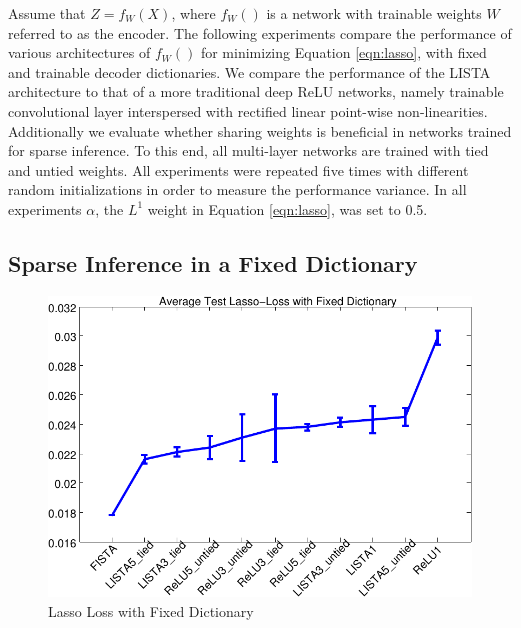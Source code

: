 Assume that $Z=f_W(X)$, where $f_W()$ is a network with trainable weights $W$
referred to as the encoder.  The following experiments compare the performance
of various architectures of $f_W()$ for minimizing Equation \ref{eqn:lasso},
with fixed and trainable decoder dictionaries. We compare the performance of
the LISTA architecture to that of a more traditional deep ReLU networks, namely
trainable convolutional layer interspersed with rectified linear point-wise
non-linearities.  Additionally we evaluate whether sharing weights is
beneficial in networks trained for sparse inference. To this end, all
multi-layer networks are trained with tied and untied weights. All experiments
were repeated five times with different random initializations in order to
measure the performance variance. In all experiments $\alpha$, the $L^1$ weight
in Equation \ref{eqn:lasso}, was set to 0.5.   

\subsection{Sparse Inference in a Fixed Dictionary}      

\begin{figure} \centering
\includegraphics[scale=0.75]{./figures/LISTA/fixed_decoder_loss.pdf}
\caption{Lasso Loss with Fixed Dictionary} \label{fig:lasso_loss_fixed} \end{figure}  

